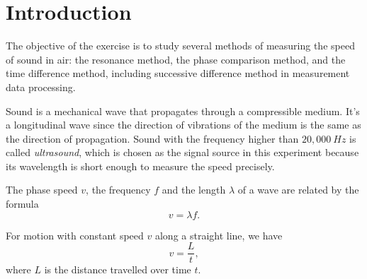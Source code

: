 \section{Introduction}

The objective of the exercise is to study several methods of measuring the
speed of sound in air: the resonance method, the phase comparison method, and
the time difference method, including successive difference method in
measurement data processing.
    
Sound is a mechanical wave that propagates through a compressible medium.
It's a longitudinal wave since the direction of vibrations of the medium is
the same as the direction of propagation. Sound with the frequency higher
than $20,000\ Hz$ is called \emph{ultrasound}, which is chosen as the signal
source in this experiment because its wavelength is short enough to measure
the speed precisely.
    
The phase speed $v$, the frequency $f$ and the length $\lambda$ of a wave are
related by the formula 
\begin{equation}\label{vlf}
    v=\lambda f.
\end{equation}

For motion with constant speed $v$ along a straight line, we have 
\begin{equation}\label{vlt}
    v=\frac{L}{t},
\end{equation}
where $L$ is the distance travelled over time $t$. 

